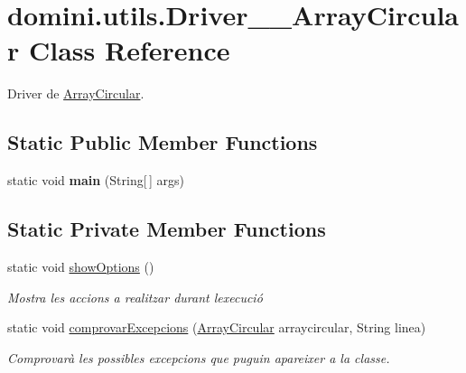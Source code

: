 \hypertarget{classdomini_1_1utils_1_1Driver____ArrayCircular}{}\section{domini.\+utils.\+Driver\+\_\+\+\_\+\+Array\+Circular Class Reference}
\label{classdomini_1_1utils_1_1Driver____ArrayCircular}


Driver de \hyperlink{classdomini_1_1utils_1_1ArrayCircular}{Array\+Circular}.  


\subsection*{Static Public Member Functions}
\begin{DoxyCompactItemize}
\item 
\mbox{\label{classdomini_1_1utils_1_1Driver____ArrayCircular_adf8b1dedd521248da8a5f1425dd27af8}} 
static void {\bfseries main} (String\mbox{[}$\,$\mbox{]} args)
\end{DoxyCompactItemize}
\subsection*{Static Private Member Functions}
\begin{DoxyCompactItemize}
\item 
\mbox{\label{classdomini_1_1utils_1_1Driver____ArrayCircular_afac5a37f91b2914e692993e71c2d393c}} 
static void \hyperlink{classdomini_1_1utils_1_1Driver____ArrayCircular_afac5a37f91b2914e692993e71c2d393c}{show\+Options} ()
\begin{DoxyCompactList}\small\item\em Mostra les accions a realitzar durant l\textquotesingle{}execució \end{DoxyCompactList}\item 
static void \hyperlink{classdomini_1_1utils_1_1Driver____ArrayCircular_a0f5f42c5ace9176cfcae4dfe9717f380}{comprovar\+Excepcions} (\hyperlink{classdomini_1_1utils_1_1ArrayCircular}{Array\+Circular} arraycircular, String linea)
\begin{DoxyCompactList}\small\item\em Comprovarà les possibles excepcions que puguin apareixer a la classe. \end{DoxyCompactList}\end{DoxyCompactItemize}


